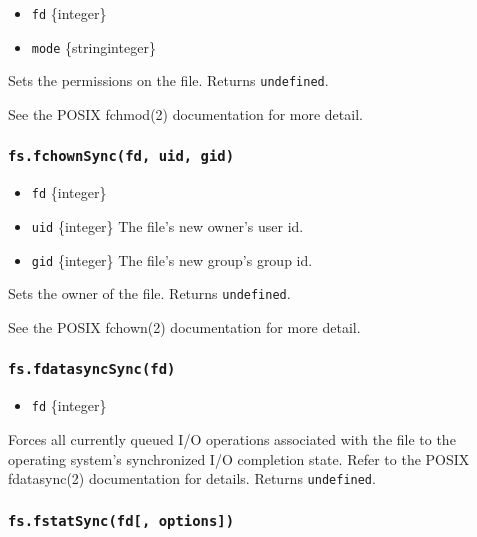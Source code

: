 \begin{itemize}
\tightlist
\item
  \texttt{fd} \{integer\}
\item
  \texttt{mode} \{string\textbar integer\}
\end{itemize}

Sets the permissions on the file. Returns \texttt{undefined}.

See the POSIX fchmod(2) documentation for more detail.

\subsubsection{\texorpdfstring{\texttt{fs.fchownSync(fd,\ uid,\ gid)}}{fs.fchownSync(fd, uid, gid)}}\label{fs.fchownsyncfd-uid-gid}

\begin{itemize}
\tightlist
\item
  \texttt{fd} \{integer\}
\item
  \texttt{uid} \{integer\} The file's new owner's user id.
\item
  \texttt{gid} \{integer\} The file's new group's group id.
\end{itemize}

Sets the owner of the file. Returns \texttt{undefined}.

See the POSIX fchown(2) documentation for more detail.

\subsubsection{\texorpdfstring{\texttt{fs.fdatasyncSync(fd)}}{fs.fdatasyncSync(fd)}}\label{fs.fdatasyncsyncfd}

\begin{itemize}
\tightlist
\item
  \texttt{fd} \{integer\}
\end{itemize}

Forces all currently queued I/O operations associated with the file to
the operating system's synchronized I/O completion state. Refer to the
POSIX fdatasync(2) documentation for details. Returns
\texttt{undefined}.

\subsubsection{\texorpdfstring{\texttt{fs.fstatSync(fd{[},\ options{]})}}{fs.fstatSync(fd{[}, options{]})}}\label{fs.fstatsyncfd-options}

